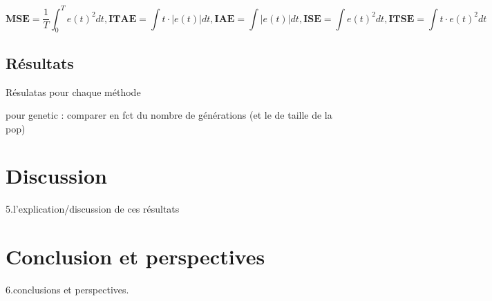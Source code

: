 \documentclass[a4paper,10pt]{report}
\begin{document}
$$
\textbf{MSE} = \frac{1}{T} \int_0^T e(t)^2 dt,
\textbf{ITAE} = \int t \cdot |e(t)| dt,
\textbf{IAE} = \int |e(t)| dt,
\textbf{ISE} = \int e(t)^2 dt,
\textbf{ITSE} = \int t \cdot e(t)^2 dt
$$


\section{Résultats}
Résulatas pour chaque méthode

pour genetic : comparer en fct du nombre de générations (et le de taille de la pop)

\chapter{Discussion}
5.l’explication/discussion de ces résultats

\chapter{Conclusion et perspectives}
6.conclusions et perspectives.




\end{document}
